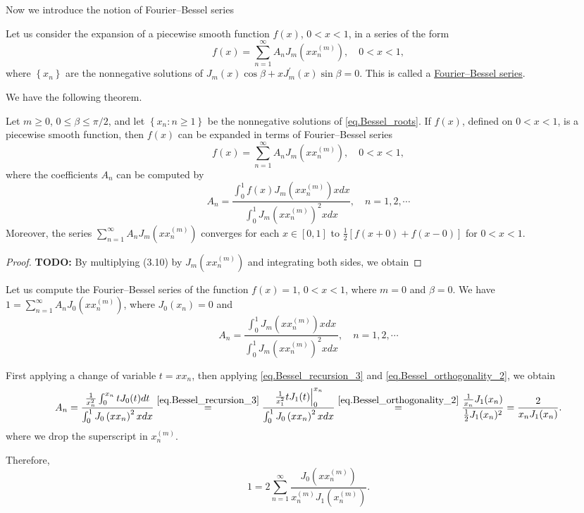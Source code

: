 Now we introduce the notion of Fourier--Bessel series

\begin{definition}
    Let us consider the expansion of a piecewise smooth function $f(x)$, $0<x<1$, in a series of the form
$$
f(x)=\sum_{n=1}^{\infty} A_n J_m\left(x x_n^{(m)}\right), \quad 0<x<1,
$$
where $\left\{x_n\right\}$ are the nonnegative solutions of $J_m(x) \cos \beta+x J_m^{\prime}(x) \sin \beta=0$. This is called a \underline{Fourier--Bessel series}. 
\end{definition}

We have the following theorem.

\begin{theorem}[]
Let $m \geq 0$, $0 \leq \beta \leq \pi / 2$, and let $\left\{x_n: n \geq 1\right\}$ be the nonnegative solutions of \eqref{eq.Bessel_roots}. If $f(x)$, defined on $0<x<1$, is a piecewise smooth function, then $f(x)$ can be expanded in terms of Fourier--Bessel series
$$
    f(x)=\sum_{n=1}^{\infty} A_n J_m\left(x x_n^{(m)}\right), \quad 0<x<1,
$$
where the coefficients $A_n$ can be computed by
$$
    A_n=\frac{\int_0^1 f(x) J_m\left(x x_n^{(m)}\right) x d x}{\int_0^1 J_m\left(x x_n^{(m)}\right)^2 x d x}, \quad n=1,2, \cdots
$$
Moreover, the series $\sum_{n=1}^{\infty} A_n J_m\left(x x_n^{(m)}\right)$ converges for each $x \in[0,1]$ to $\frac{1}{2}[f(x+0)+f(x-0)]$ for $0<x<1$.
\end{theorem}
\begin{proof}
    \textbf{TODO: } By multiplying (3.10) by $J_m\left(x x_n^{(m)}\right)$ and integrating both sides, we obtain
\end{proof}

\begin{example}[]\label{ex.Fourier_Bessel_1}
Let us compute the Fourier--Bessel series of the function $f(x)=1$, $0<x<1$, where $m=0$ and $\beta=0$. We have $1=\sum_{n=1}^{\infty} A_n J_0\left(x x_n^{(m)}\right)$, where $J_0(x_n)=0$ and
$$
A_n=\frac{\int_0^1 J_m\left(x x_n^{(m)}\right) x d x}{\int_0^1 J_m\left(x x_n^{(m)}\right)^2 x d x}, \quad n=1,2, \cdots
$$

First applying a change of variable $t = xx_n$, then applying \eqref{eq.Bessel_recursion_3} and \eqref{eq.Bessel_orthogonality_2}, we obtain
$$
A_n=\frac{\frac{1}{x_n^2} \int_0^{x_n} t J_0(t) d t}{\int_0^1 J_0\left(x x_n\right)^2 x d x}\overset{\eqref{eq.Bessel_recursion_3}}{=}\frac{\left.\frac{1}{x_1^2} t J_1(t)\right|_0 ^{x_n}}{\int_0^1 J_0\left(x x_n\right)^2 x d x}\overset{\eqref{eq.Bessel_orthogonality_2}}{=}\frac{\frac{1}{x_n} J_1(x_n)}{\frac{1}{2} J_1(x_n)^2}=\frac{2}{x_n J_1(x_n)} .
$$
where we drop the superscript in $x_n^{(m)}$.

Therefore,
$$
1=2 \sum_{n=1}^{\infty} \frac{J_0\left(x x_n^{(m)}\right)}{x_n^{(m)} J_1\left(x_n^{(m)}\right)}.
$$
\end{example}


